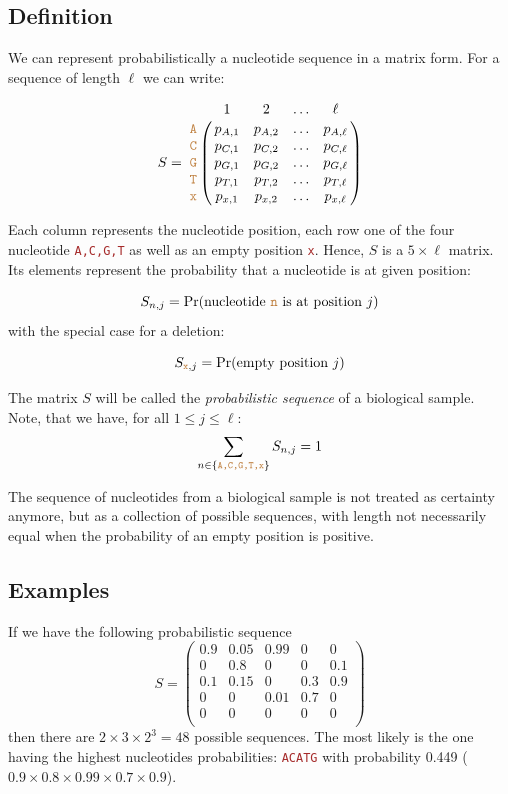 \documentclass[12pt]{article}
\newcommand{\sq}[1]{\texttt{\textcolor{brown}{#1}}}
\newcommand{\pr}[1]{\mathrm{Pr}(#1)}
\begin{document}
\subsection{Definition}
 
We can represent probabilistically a nucleotide sequence in a matrix form. For a sequence of length $\ell$ we can write:

$$S = \bordermatrix{   & 1 & 2 & \ldots & \ell \cr
                \sq{A} & p_{A, 1} & p_{A, 2} & \ldots & p_{A, \ell} \cr
                \sq{C} & p_{C, 1} & p_{C, 2} & \ldots & p_{C, \ell} \cr
                \sq{G} & p_{G, 1} & p_{G, 2} & \ldots & p_{G, \ell} \cr
                \sq{T} & p_{T, 1} & p_{T, 2} & \ldots & p_{T, \ell} \cr 
                \sq{x} & p_{x, 1} & p_{x, 2} & \ldots & p_{x, \ell} \cr 
}$$

Each column represents the nucleotide position, each row one of the four nucleotide \sq{A,C,G,T} as well as an empty position \sq{x}.
Hence, $S$ is a $5\times\ell$ matrix. Its elements represent the probability that a nucleotide is at given position:

\begin{equation}
S_{n,j} = \pr{\text{nucleotide \sq{n} is at position }j}
\end{equation}
with the special case for a deletion:

\begin{equation}
S_{\sq{x},j} = \pr{\text{empty position }j}
\end{equation}

The matrix $S$ will be called the \emph{probabilistic sequence} of a biological sample.
Note, that we have, for all $1\leq j \leq \ell$:
\begin{equation}
\sum_{n\in \{ \sq{A,C,G,T,x} \} } S_{n, j} = 1
\end{equation}

The sequence of nucleotides from a biological sample is not treated as certainty anymore, but as a collection of possible sequences, with length not necessarily equal when the probability of an empty position is positive. 



\subsection{Examples}

If we have the following probabilistic sequence
$$
S = 
\begin{pmatrix}
0.9 & 0.05   & 0.99 & 0 & 0\\
0   & 0.8 & 0 & 0 & 0.1\\
0.1 & 0.15 & 0 & 0.3 & 0.9\\
0 & 0 & 0.01 & 0.7 & 0\\
0 & 0 & 0 & 0 & 0\\
\end{pmatrix}
$$
then there are $2\times 3 \times 2^3 = 48$ possible sequences. The most likely is the one having the highest nucleotides probabilities: \sq{ACATG} with probability 0.449  ($0.9\times 0.8\times 0.99 \times 0.7 \times 0.9$).
\end{document}
